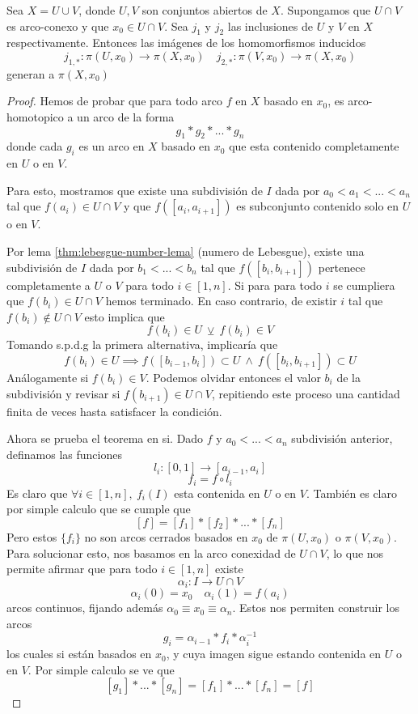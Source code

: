 \begin{teorema} \label{thm:vank-especifico}
  Sea \(X = U \cup V\), donde \(U,V\) son conjuntos abiertos de \(X\).
  Supongamos que \(U \cap V\) es arco-conexo y que \(x_0 \in U \cap V\).
  Sea \(j_1\) y \(j_2\) las inclusiones de \(U\) y \(V\) en \(X\)
  respectivamente. Entonces las imágenes de los homomorfismos inducidos
  \[ j_{1,*} : \pi (U, x_0) \to \pi (X, x_0) \quad j_{2,*} : \pi
  (V, x_0) \to \pi (X, x_0) \]
  generan a \(\pi (X,x_0)\)
\end{teorema}
\begin{proof}
  Hemos de probar que para todo arco \(f\) en \(X\) basado en \(x_0\),
  es arco-homotopico a un arco de la forma
  \[ g_1 * g_2 * ... * g_n \]
  donde cada \(g_i\) es un arco en \(X\) basado en \(x_0\) que esta
  contenido completamente en \(U\) o en \(V\).

  Para esto, mostramos que existe una subdivisión de \(I\) dada por
  \(a_0 < a_1 < ... < a_n \) tal que \(f(a_i) \in U \cap V\) y que \(
  f([a_i , a_{i+1}]) \) es subconjunto contenido solo en \(U\) o en
  \(V\).

  Por lema \ref{thm:lebesgue-number-lema} (numero de Lebesgue),
  existe una subdivisión de \(I\) dada por \(b_1 < ... < b_n\) tal que
  \(f ([b_i , b_{i+1}])\) pertenece completamente a \(U\) o \(V\) para
  todo \(i \in [1,n]\). Si para para todo \(i\) se cumpliera que
  \(f(b_i) \in U \cap V\) hemos terminado. En caso contrario, de existir
  \(i\) tal que \(f(b_i) \not \in U \cap V\) esto implica que
  \[ f(b_i) \in U \ \veebar \ f(b_i) \in V \]
  Tomando s.p.d.g la primera alternativa, implicaría que
  \[ f(b_i) \in U \implies f([b_{i-1}, b_{i}]) \subset U \ \land \ f([b_i,
    b_{i+1}]) \subset U \]
  Análogamente si \(f(b_i) \in V\). Podemos olvidar entonces el valor
  \(b_i\) de la subdivisión y revisar si \(f(b_{i+1}) \in U \cap V\),
  repitiendo este proceso una cantidad finita de veces hasta satisfacer
  la condición.

  Ahora se prueba el teorema en si. Dado \(f\) y \(a_0 < ... < a_n\)
  subdivisión anterior, definamos las funciones
  \[ l_i : [0,1] \to [a_{i-1}, a_{i}] \]
  \[ f_i = f \circ l_i \]
  Es claro que \(\forall i \in [1, n], \ f_i (I) \) esta contenida en
  \(U\) o en \(V\). También es claro por simple calculo que se cumple
  que
  \[ [f] = [f_1] * [f_2] * ... * [f_n] \]
  Pero estos \(\{f_i\}\) no son arcos cerrados basados en \(x_0\) de
  \(\pi (U,x_0)\) o \(\pi (V,x_0)\). Para solucionar esto, nos basamos
  en la arco conexidad de \(U \cap V\), lo que nos permite afirmar que
  para todo \(i \in [1 , n]\) existe
  \[ \alpha_i : I \to U \cap V \]
  \[ \alpha_i (0) = x_0 \quad \alpha_i (1) = f(a_i) \]
  arcos continuos, fijando además \(\alpha_0 \equiv x_0 \equiv \alpha_n
  \). Estos nos permiten construir los arcos
  \[ g_i = \alpha_{i-1} * f_i * \alpha_i^{-1} \]
  los cuales si están basados en \(x_0\), y cuya imagen sigue estando
  contenida en \(U\) o en \(V\). Por simple calculo se ve que
  \[ [g_1] * ... * [g_n] = [f_1] * ... * [f_n] = [f] \]
\end{proof}
